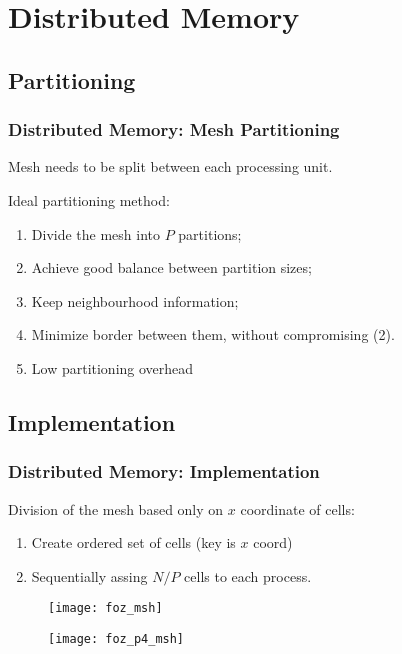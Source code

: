 \section{Distributed Memory}


\subsection{Partitioning}

\begin{frame}
	\frametitle{Distributed Memory: Mesh Partitioning}

	Mesh needs to be split between each processing unit.
	\begin{block}{Ideal partitioning method:}
		\begin{enumerate}
			\item Divide the mesh into $P$ partitions;
			\item Achieve good balance between partition sizes;
			\item Keep neighbourhood information;
			\item Minimize border between them, without compromising (2).
			\item Low partitioning overhead
		\end{enumerate}
	\end{block}

\end{frame}

\subsection{Implementation}

\begin{frame}
	\frametitle{Distributed Memory: Implementation}

	Division of the mesh based only on $x$ coordinate of cells:
	\begin{enumerate}
		\item Create ordered set of cells (key is $x$ coord)
		\item Sequentially assing $N/P$ cells to each process.
	\end{enumerate}

	\begin{multicols}{2}
		\begin{figure}
			\begin{center}
				\texttt{[image: foz\_msh]}
			\end{center}
		\end{figure}
		\pause
		\begin{figure}
			\begin{center}
				\texttt{[image: foz\_p4\_msh]}
			\end{center}
		\end{figure}
	\end{multicols}
\end{frame}

